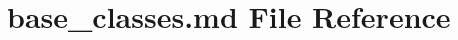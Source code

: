 \hypertarget{base__classes_8md}{}\section{base\+\_\+classes.\+md File Reference}
\label{base__classes_8md}
